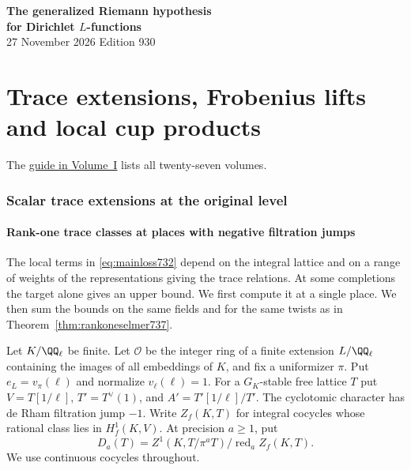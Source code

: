 \documentclass[a4paper,11pt]{article}
\theoremstyle{definition}
\theoremstyle{remark}
\numberwithin{equation}{section}
\begin{document}
\setcounter{part}{2}
\thispagestyle{plain}\begin{center}
{\LARGE\bfseries The generalized Riemann hypothesis\\[2pt]for Dirichlet \(L\)-functions}\\[6pt]
{\small 27 November 2026 \quad\textperiodcentered\quad Edition 930}\end{center}
\part{Trace extensions, Frobenius lifts and local cup products}\label{part:III}
\begin{abstract}\noindent We analyze the integral extensions detected by the marked traces. Local Frobenius lattices, cup products and Taylor conditions give bounds for the scalar and higher-rank terms at spherical and ramified primes.\end{abstract}
\setcounter{section}{14}
\noindent The \hyperref[seriesguide]{guide in Volume~I} lists all twenty-seven volumes.
\begingroup\small\setlength{\parskip}{0pt}\tableofcontents\endgroup
\clearpage

\section{Scalar trace extensions at the original level}\label{nav:trace-extensions}\label{nav:volume-III}

\subsection{Rank-one trace classes at places with negative filtration jumps}
\label{sec:negtrace740}

The local terms in \eqref{eq:mainloss732} depend on the integral
lattice and on a range of weights of the representations giving
the trace relations. At some completions the target alone gives
an upper bound. We first compute it at a single place. We then
sum the bounds on the same fields and for the same twists as in
Theorem~\ref{thm:rankoneselmer737}.

Let \(K/\QQ_\ell\) be finite. Let \(\mathcal O\) be the integer
ring of a finite extension \(L/\QQ_\ell\) containing the images
of all embeddings of \(K\), and fix a uniformizer \(\pi\). Put
\(e_L=v_\pi(\ell)\) and normalize \(v_\ell(\ell)=1\).
For a \(G_K\)-stable free lattice \(T\) put \(V=T[1/\ell]\),
\(T'=T^\vee(1)\), and \(A'=T'[1/\ell]/T'\). The cyclotomic
character has de Rham filtration jump \(-1\). Write \(Z_f(K,T)\)
for integral cocycles whose rational class lies in \(H^1_f(K,V)\).
At precision \(a\ge1\), put
\[
 D_a(T)=
 Z^1(K,T/\pi^a T)\big/\operatorname{red}_{a} Z_f(K,T).
\]
We use continuous cocycles throughout.
\end{document}
